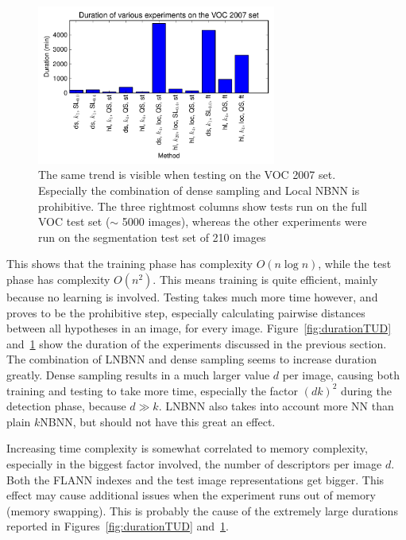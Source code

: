 \begin{figure}[hbt]
    \centering
    \includegraphics[width=0.7\textwidth]{DurVOC}
    \caption{The same trend is visible when testing on the VOC 2007 set. Especially the combination of dense sampling and Local NBNN is prohibitive. The three rightmost columns show tests run on the full VOC test set ($\sim$ 5000 images), whereas the other experiments were run on the segmentation test set of 210 images}
    \label{fig:durationVOC}
\end{figure}

This shows that the training phase has complexity $O(n\log n)$, while the test phase has complexity $O(n^2)$. This means training is quite efficient, mainly because no learning is involved. Testing takes much more time however, and proves to be the prohibitive step, especially calculating pairwise distances between all hypotheses in an image, for every image. Figure~\ref{fig:durationTUD} and~\ref{fig:durationVOC} show the duration of the experiments discussed in the previous section. The combination of LNBNN and dense sampling seems to increase duration greatly. Dense sampling results in a much larger value $d$ per image, causing both training and testing to take more time, especially the factor $(dk)^2$ during the detection phase, because $d\gg k$. LNBNN also takes into account more NN than plain $k$NBNN, but should not have this great an effect.

Increasing time complexity is somewhat correlated to memory complexity, especially in the biggest factor involved, the number of descriptors per image $d$. Both the FLANN indexes and the test image representations get bigger. This effect may cause additional issues when the experiment runs out of memory (memory swapping). This is probably the cause of the extremely large durations reported in Figures~\ref{fig:durationTUD} and~\ref{fig:durationVOC}.



